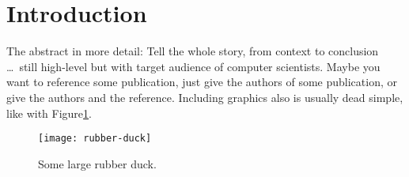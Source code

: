 \section{Introduction} \label{introduction}

The abstract in more detail: Tell the whole story, from context to conclusion \ldots\ still high-level but with target audience of computer scientists. Maybe you want to reference some publication, just give the authors of some publication, or give the authors and the reference. Including graphics also is usually dead simple, like with Figure\ref{rubber-duck}.

\begin{figure}[t]
    \centering
    \texttt{[image: rubber-duck]}
    \caption{Some large rubber duck.}
    \label{rubber-duck}
\end{figure}

